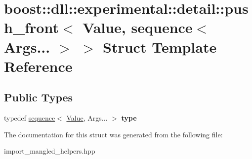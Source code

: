 \hypertarget{a00237}{}\section{boost\+:\+:dll\+:\+:experimental\+:\+:detail\+:\+:push\+\_\+front$<$ Value, sequence$<$ Args... $>$ $>$ Struct Template Reference}
\label{a00237}
\subsection*{Public Types}
\begin{DoxyCompactItemize}
\item 
typedef \hyperlink{a00266}{sequence}$<$ \hyperlink{a00473_a071cf97155ba72ac9a1fc4ad7e63d481}{Value}, Args... $>$ {\bfseries type}\hypertarget{a00237_a3f3ed50c281dc66f94de95ad5ae3535b}{}\label{a00237_a3f3ed50c281dc66f94de95ad5ae3535b}

\end{DoxyCompactItemize}


The documentation for this struct was generated from the following file\+:\begin{DoxyCompactItemize}
\item 
import\+\_\+mangled\+\_\+helpers.\+hpp\end{DoxyCompactItemize}
